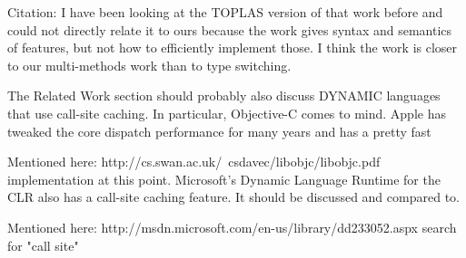 Citation\cite{Millstein:2002:MTH:581478.581489}:
I have been looking at the TOPLAS version of that work before and could not 
directly relate it to ours because the work gives syntax and semantics of 
features, but not how to efficiently implement those. I think the work is closer 
to our multi-methods work than to type switching.

The Related Work section should probably also discuss DYNAMIC languages that
use call-site caching. In particular, Objective-C comes to mind. Apple has
tweaked the core dispatch performance for many years and has a pretty fast

Mentioned here: http://cs.swan.ac.uk/~csdavec/libobjc/libobjc.pdf 
implementation at this point. Microsoft's Dynamic Language Runtime for the CLR
also has a call-site caching feature. It should be discussed and compared to.

Mentioned here:  http://msdn.microsoft.com/en-us/library/dd233052.aspx search for "call site"